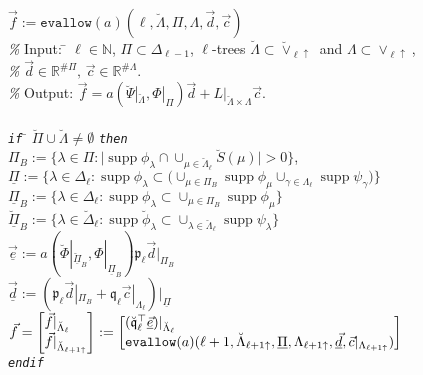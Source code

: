 \documentclass{amsart}
\theoremstyle{definition}
\theoremstyle{remark}
\numberwithin{equation}{section}
\newcommand{\R}{\mathbb R}
\newcommand{\N}{\mathbb N}
\DeclareMathOperator{\supp}{supp}
\newcommand{\1}{\mathbb 1}
\begin{document}
 
 {\em \begin{tabbing}
$\vec{f}:=\mathtt{evallow}(a)(\ell,\breve{\Lambda},\Pi,\Lambda,\vec{d},\vec{c})$\\
%
{\em \%} Input: \= $\ell \in \N$,
$\Pi\subset \Delta_{\ell-1}$, 
$\ell$-trees $\breve{\Lambda} \subset \breve{\vee}_{\ell\uparrow}$ and $\Lambda \subset {\vee}_{\ell\uparrow}$,\\
{\em \%} \> $\vec{d} \in \R^{\# \Pi},\, \vec{c} \in \R^{\# \Lambda}$. \\
%
{\em \%} Output: 
$\vec{f}=a(\breve{\Psi}|_{\breve{\Lambda}},\Phi|_{\Pi})\vec{d}+L|_{\breve{\Lambda} \times \Lambda} \vec{c}$.\\ \\
%
%
{\em \texttt{if}} \= $\breve{\Pi} \cup \breve{\Lambda}\neq \emptyset$ {\em \texttt{then}}\\
%
%
\>$\Pi_B:=\{\lambda \in \Pi\colon \big|\supp \phi_\lambda \cap \cup_{\mu \in \breve{\Lambda}_\ell} \breve{S}(\mu) \big|>0\}$,\\
\>$\underline{\Pi}:=\{\lambda \in \Delta_{\ell}\colon \supp \phi_\lambda \subset \big(\cup_{\mu \in \Pi_B} \supp \phi_\mu \cup_{\gamma \in \Lambda_\ell} \supp\psi_\gamma\big)\}$\\ 

\>$\underline{\Pi}_B:=\{\lambda \in \Delta_{\ell}\colon \supp \phi_\lambda \subset \cup_{\mu \in \Pi_B} \supp \phi_\mu\}$\\
\>$\underline{\breve{\Pi}}_B:=\{\lambda \in \breve{\Delta}_{\ell}\colon \supp \breve{\phi}_\lambda \subset \cup_{\lambda  \in \breve{\Lambda}_\ell} \supp \psi_\lambda\}$\\
%
\>$\underline{\vec{e}}:=a(\breve{\Phi}|_{\underline{\breve{\Pi}}_B},\Phi|_{\underline{\Pi}_B}) \mathfrak{p}_{\ell} \vec{d}|_{\Pi_B}$\\
\>$\underline{\vec{d}}:=(\mathfrak{p}_{\ell} \vec{d}|_{\Pi_B}+\mathfrak{q}_\ell \vec{c}|_{\Lambda_{\ell}})|_{\underline{\Pi}}$\\
\>$\vec{f}=
\left[\begin{array}{@{}l@{}} \vec{f}|_{\breve{\Lambda}_\ell} \\ \vec{f}|_{\breve{\Lambda}_{\ell+1\uparrow}}\end{array}\right]
:=
\left[\begin{array}{@{}l@{}} (\mathfrak{\breve{q}}_\ell^\top \underline{\vec{e}})|_{\breve{\Lambda}_{\ell}} \\ 
\mathtt{evallow}(a)(\ell+1, \breve{\Lambda}_{\ell+1\uparrow}, \underline{\Pi}, \Lambda_{\ell+1\uparrow},\underline{\vec{d}}, \vec{c}|_{\Lambda_{\ell+1\uparrow}}) \end{array}\right]$\\
{\em \texttt{endif}}
 \end{tabbing}}
 
\end{document}
